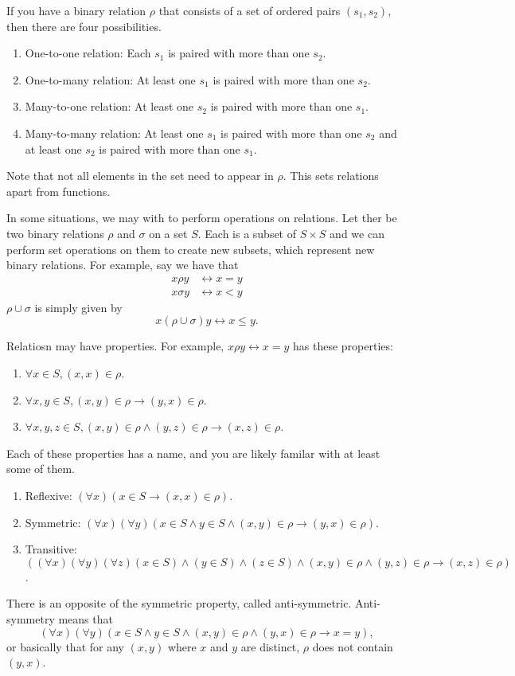 \documentclass[nobib]{tufte-handout}
\begin{document}
If you have a binary relation $\rho$ that consists of 
a set of ordered pairs $(s_1, s_2)$, then there
are four possibilities.
\begin{enumerate}
    \item One-to-one relation: Each $s_1$ is paired with more than one $s_2$. 
    \item One-to-many relation: At least one $s_1$ is paired with more than one $s_2$. 
    \item Many-to-one relation: At least one $s_2$ is paired with more than one $s_1$. 
    \item Many-to-many relation: At least one $s_1$ is paired with more than one $s_2$ and 
    at least one $s_2$ is paired with more than one $s_1$. 
\end{enumerate}
Note that not all elements in the set need to appear in $\rho$. This 
sets relations apart from functions. 

In some situations, we may with to perform operations 
on relations. Let ther be two binary relations 
$\rho$ and $\sigma$ on a set $S$. Each is a subset 
of $S\times S$ and we can perform set operations 
on them to create new subsets, which represent new 
binary relations. For example, say we have that 
\begin{align*}
    x \rho y &\leftrightarrow x = y \\
    x \sigma y &\leftrightarrow x < y
\end{align*}
$\rho \cup \sigma$ is simply given by 
\[ x (\rho \cup \sigma) y \leftrightarrow x \leq y.\]

Relatiosn may have properties. For example, 
$x \rho y \leftrightarrow x = y$ has these properties:
\begin{enumerate}
    \item $\forall x\in S, (x,x) \in \rho$. 
    \item $\forall x, y \in S, (x,y) \in \rho \rightarrow (y,x) \in \rho$. 
    \item $\forall x,y,z \in S, (x,y) \in \rho \land (y,z) \in \rho \rightarrow (x,z) \in \rho$.
\end{enumerate}
Each of these properties has a name, and 
you are likely familar with at least some of them. 
\begin{enumerate}
    \item Reflexive: $(\forall x)(x \in S \rightarrow (x,x) \in \rho)$.
    \item Symmetric: $(\forall x)(\forall y)(x \in S \land y \in S \land (x,y) \in \rho \rightarrow (y,x) \in \rho)$.
    \item Transitive: $((\forall x)(\forall y)(\forall z)(x\in S) \land (y\in S) \land (z\in S) \land (x,y) \in \rho \land (y,z) \in \rho \rightarrow (x,z) \in \rho)$. 
\end{enumerate}
There is an opposite of the symmetric property, 
called anti-symmetric. 
Anti-symmetry means that 
\[(\forall x)(\forall y)(x \in S \land y \in S \land (x,y)\in \rho \land (y,x) \in \rho \rightarrow x = y),\]
or basically that for any $(x,y)$ where $x$ and $y$ are distinct, $\rho$ does not contain $(y,x)$. 
\end{document}
